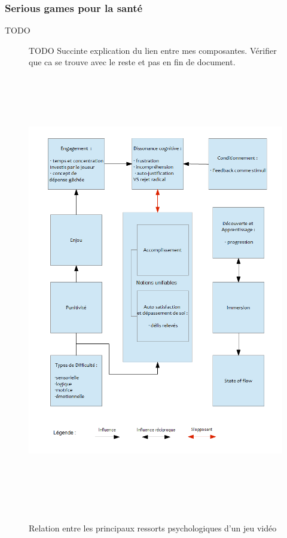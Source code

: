 	\subsubsection{Serious games pour la santé}
TODO 
\begin{figure}
TODO Succinte explication du lien entre mes composantes. Vérifier que ca se trouve avec le reste et pas en fin de document.
	\centering
	\includegraphics[height=19.6cm]{images/lien_theories}
	\caption{Relation entre les principaux ressorts psychologiques d'un jeu vidéo}
	\label{lien_theories}
\end{figure}
